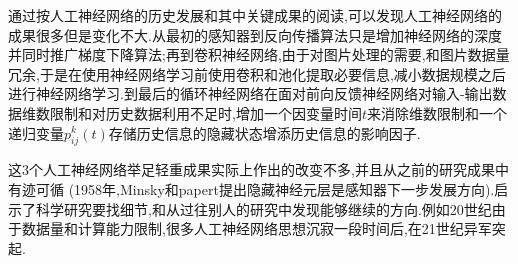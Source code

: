 通过按人工神经网络的历史发展和其中关键成果的阅读,可以发现人工神经网络的成果很多但是变化不大.从最初的感知器到反向传播算法只是增加神经网络的深度并同时推广梯度下降算法;再到卷积神经网络,由于对图片处理的需要,和图片数据量冗余,于是在使用神经网络学习前使用卷积和池化提取必要信息,减小数据规模之后进行神经网络学习.到最后的循环神经网络在面对前向反馈神经网络对输入-输出数据维数限制和对历史数据利用不足时,增加一个因变量时间$t$来消除维数限制和一个递归变量$p_{ij}^k(t)$存储历史信息的隐藏状态增添历史信息的影响因子.

这3个人工神经网络举足轻重成果实际上作出的改变不多,并且从之前的研究成果中有迹可循 (1958年,Minsky和papert提出隐藏神经元层是感知器下一步发展方向).启示了科学研究要找细节,和从过往别人的研究中发现能够继续的方向.例如20世纪由于数据量和计算能力限制,很多人工神经网络思想沉寂一段时间后,在21世纪异军突起.



















        

        \newpage
    \renewcommand\refname{参考文献}
		    


